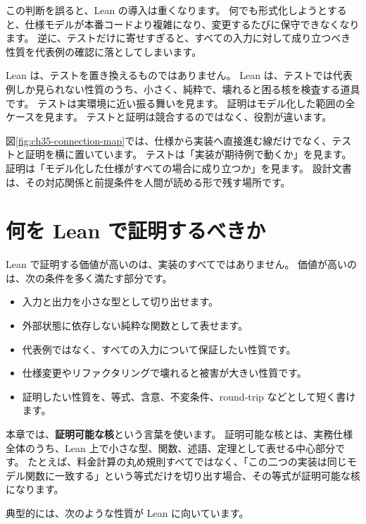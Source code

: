 この判断を誤ると、Lean の導入は重くなります。
何でも形式化しようとすると、仕様モデルが本番コードより複雑になり、変更するたびに保守できなくなります。
逆に、テストだけに寄せすぎると、すべての入力に対して成り立つべき性質を代表例の確認に落としてしまいます。

Lean は、テストを置き換えるものではありません。
Lean は、テストでは代表例しか見られない性質のうち、小さく、純粋で、壊れると困る核を検査する道具です。
テストは実環境に近い振る舞いを見ます。
証明はモデル化した範囲の全ケースを見ます。
テストと証明は競合するのではなく、役割が違います。


図\ref{fig:ch35-connection-map}では、仕様から実装へ直接進む線だけでなく、テストと証明を横に置いています。
テストは「実装が期待例で動くか」を見ます。
証明は「モデル化した仕様がすべての場合に成り立つか」を見ます。
設計文書は、その対応関係と前提条件を人間が読める形で残す場所です。

\section{何を Lean で証明するべきか}

Lean で証明する価値が高いのは、実装のすべてではありません。
価値が高いのは、次の条件を多く満たす部分です。

\begin{itemize}
\item 入力と出力を小さな型として切り出せます。
\item 外部状態に依存しない純粋な関数として表せます。
\item 代表例ではなく、すべての入力について保証したい性質です。
\item 仕様変更やリファクタリングで壊れると被害が大きい性質です。
\item 証明したい性質を、等式、含意、不変条件、round-trip などとして短く書けます。
\end{itemize}

本章では、\textbf{証明可能な核}という言葉を使います。
証明可能な核とは、実務仕様全体のうち、Lean 上で小さな型、関数、述語、定理として表せる中心部分です。
たとえば、料金計算の丸め規則すべてではなく、「この二つの実装は同じモデル関数に一致する」という等式だけを切り出す場合、その等式が証明可能な核になります。

典型的には、次のような性質が Lean に向いています。

